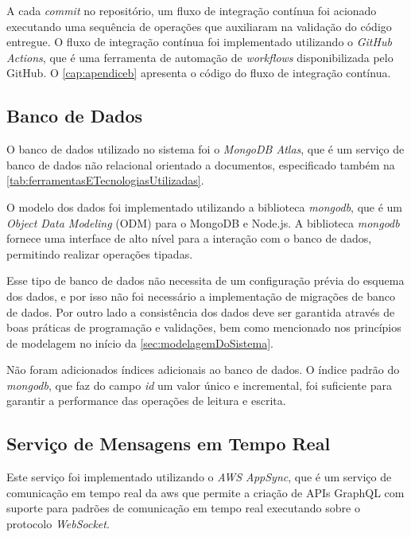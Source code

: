 \hfill\break

A cada \textit{commit} no repositório, um fluxo de integração contínua foi acionado executando uma sequência de operações que auxiliaram na validação do código entregue. O fluxo de integração contínua foi implementado utilizando o \textit{GitHub Actions}, que é uma ferramenta de automação de \textit{workflows} disponibilizada pelo GitHub. O \autoref{cap:apendiceb} apresenta o código do fluxo de integração contínua.

\subsection{Banco de Dados}
\label{subsec:bancoDeDados}

O banco de dados utilizado no sistema foi o \textit{MongoDB Atlas}, que é um serviço de banco de dados não relacional orientado a documentos, especificado também na \autoref{tab:ferramentasETecnologiasUtilizadas}.

O modelo dos dados foi implementado utilizando a biblioteca \textit{mongodb}, que é um \textit{Object Data Modeling} (ODM) para o MongoDB e Node.js. A biblioteca \textit{mongodb} fornece uma interface de alto nível para a interação com o banco de dados, permitindo realizar operações tipadas.

Esse tipo de banco de dados não necessita de um configuração prévia do esquema dos dados, e por isso não foi necessário a implementação de migrações de banco de dados. Por outro lado a consistência dos dados deve ser garantida através de boas práticas de programação e validações, bem como mencionado nos princípios de modelagem no início da \autoref{sec:modelagemDoSistema}.

Não foram adicionados índices adicionais ao banco de dados. O índice padrão do \textit{mongodb}, que faz do campo \textit{id} um valor único e incremental, foi suficiente para garantir a performance das operações de leitura e escrita.

\subsection{Serviço de Mensagens em Tempo Real}
\label{subsec:servicoDeMensagensEmTempoReal}

Este serviço foi implementado utilizando o \textit{AWS AppSync}, que é um serviço de comunicação em tempo real da \gls{aws} que permite a criação de APIs GraphQL com suporte para padrões de comunicação em tempo real executando sobre o protocolo \textit{WebSocket}.

